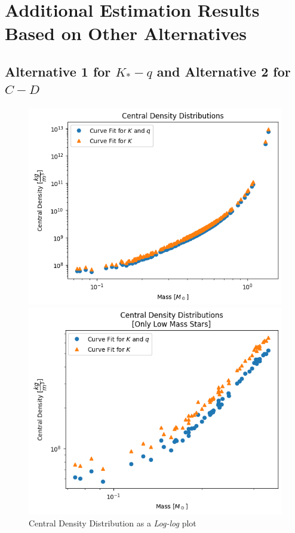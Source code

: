 \documentclass[letterpaper,12pt]{article}
\begin{document}
\appendix
\section{Additional Estimation Results Based on Other Alternatives}

\subsection{Alternative 1 for $K_* - q$ and Alternative 2 for $C-D$}


\begin{figure}[H]
\begin{minipage}{.5\textwidth}
\centerline{\includegraphics[width=\linewidth]{figures/appendix/1_2_1_n_ll_rho_m.png}}
\end{minipage}
\begin{minipage}{.5\textwidth}
\centerline{\includegraphics[width=\linewidth]{figures/appendix/1_2_2_n_ll_rho_m_.png}}
\end{minipage}
\caption{Central Density Distribution as a \textit{Log-log} plot}
\end{figure}
\end{document}
